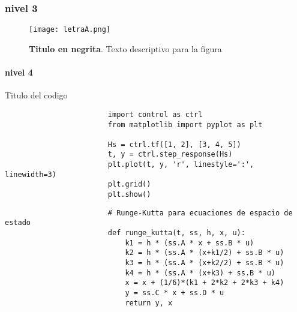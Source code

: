 		\subsubsection{nivel 3}
			
			\Blindtext

			\blindtext
			
			\begin{figure}[htb]
				\centering
				\texttt{[image: letraA.png]} %
				\caption[Titulo de la figura, este texto saldra en la lista de figuras]{\textbf{Titulo en negrita}. Texto descriptivo para la figura} 
				\label{fig:letraA}
			\end{figure}

			\paragraph{nivel 4}

				\blindtext

				\begin{longlisting}
					\caption{Titulo del codigo}
					\label{code:1}				
					\begin{verbatim}
						import control as ctrl
						from matplotlib import pyplot as plt 

						Hs = ctrl.tf([1, 2], [3, 4, 5])
						t, y = ctrl.step_response(Hs)
						plt.plot(t, y, 'r', linestyle=':', linewidth=3)
						plt.grid()
						plt.show()
					\end{verbatim}
				\end{longlisting}

				\blindtext

				\begin{longlisting}				
					\begin{verbatim}
						# Runge-Kutta para ecuaciones de espacio de estado
						def runge_kutta(t, ss, h, x, u):
							k1 = h * (ss.A * x + ss.B * u)
							k2 = h * (ss.A * (x+k1/2) + ss.B * u)
							k3 = h * (ss.A * (x+k2/2) + ss.B * u)
							k4 = h * (ss.A * (x+k3) + ss.B * u)
							x = x + (1/6)*(k1 + 2*k2 + 2*k3 + k4)
							y = ss.C * x + ss.D * u
							return y, x
					\end{verbatim}
				\end{longlisting}
	
		
			